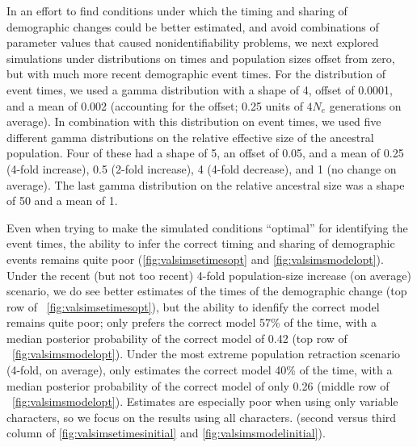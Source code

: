In an effort to find conditions under which the timing and sharing of
demographic changes could be better estimated, and avoid combinations
of parameter values that caused nonidentifiability problems,
we next explored simulations under distributions on times and population sizes
offset from zero, but with much more recent demographic event times.
For the distribution of event times, we used a gamma distribution
with a shape of 4, offset of 0.0001, and a mean of 0.002 (accounting
for the offset; 0.25 units of $4N_e$ generations on average).
In combination with this distribution on event times,
we used five different gamma distributions on the relative
effective size of the ancestral population.
Four of these had a shape of 5, an offset of 0.05, and a mean
of
0.25 (4-fold increase),
0.5 (2-fold increase),
4 (4-fold decrease),
and
1 (no change on average).
The last gamma distribution on the relative ancestral size was a shape of 50
and a mean of 1.

Even when trying to make the simulated conditions ``optimal'' for identifying
the event times, the ability to infer the correct timing and sharing of
demographic events remains quite poor
(\figs \ref{fig:valsimsetimesopt} and \ref{fig:valsimsmodelopt}).
Under the recent (but not too recent) 4-fold population-size increase (on
average) scenario, we do see better estimates of the times of the demographic
change
(top row of \fig{}~\ref{fig:valsimsetimesopt}),
but the ability to idenfify the correct model remains quite poor;
\ecoevolity only prefers the correct model 57\% of the time, with
a median posterior probability of the correct model of 0.42
(top row of \fig{}~\ref{fig:valsimsmodelopt}).
Under the most extreme population retraction scenario (4-fold, on average),
\ecoevolity only estimates the correct model 40\% of the time, with a median
posterior probability of the correct model of only 0.26
(middle row of \fig{}~\ref{fig:valsimsmodelopt}).
Estimates are especially poor when using only variable characters,
so we focus on the results using all characters.
(second versus third column of \figs
\ref{fig:valsimsetimesinitial}
and
\ref{fig:valsimsmodelinitial}).

